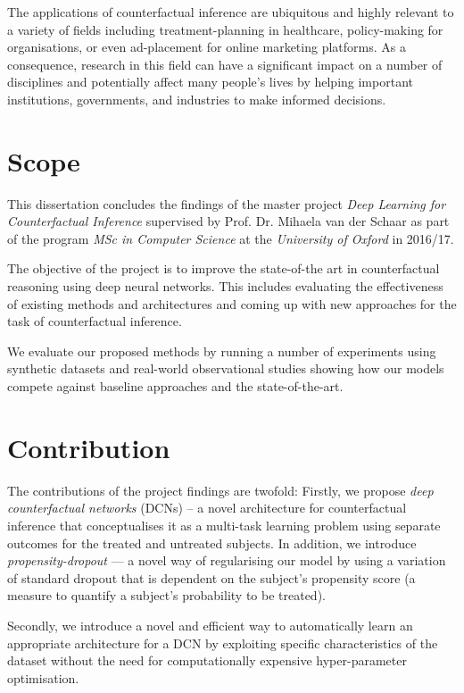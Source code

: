 The applications of counterfactual inference are ubiquitous and highly relevant to a variety of fields including treatment-planning in healthcare, policy-making for organisations, or even ad-placement for online marketing platforms. As a consequence, research in this field can have a significant impact on a number of disciplines and potentially affect many people’s lives by helping important institutions, governments, and industries to make informed decisions.


\section{Scope}

This dissertation concludes the findings of the master project \emph{Deep Learning for Counterfactual Inference} supervised by Prof. Dr. Mihaela van der Schaar as part of the program \emph{MSc in Computer Science} at the \emph{University of Oxford} in 2016/17. 

The objective of the project is to improve the state-of-the art in counterfactual reasoning using deep neural networks. This includes evaluating the effectiveness of existing methods and architectures and coming up with new approaches for the task of counterfactual inference.

We evaluate our proposed methods by running a number of experiments using synthetic datasets and real-world observational studies showing how our models compete against baseline approaches and the state-of-the-art. 

\section{Contribution}
The contributions of the project findings are twofold: 
Firstly, we propose \emph{deep counterfactual networks} (DCNs) -- a novel architecture for counterfactual inference  that conceptualises it as a multi-task learning problem \cite{multi-task-learning} using separate outcomes for the treated and untreated subjects. In addition, we introduce \emph{propensity-dropout} --- a novel way of regularising our model by using a variation of standard dropout \cite{dropout}
that is dependent on the subject's propensity score \cite{propensity-score} (a measure to quantify a subject's probability to be treated). 

Secondly, we introduce a novel and efficient way to automatically learn an appropriate architecture for a DCN by exploiting specific characteristics of the dataset without the need for computationally expensive hyper-parameter optimisation. 


